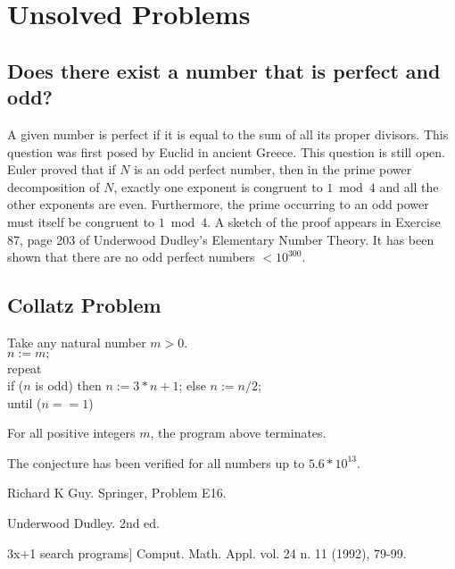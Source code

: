\section{Unsolved Problems}

\subsection{Does there exist a number that is perfect and odd?}

A given number is perfect if it is equal to the sum of all its proper
divisors. This question was first posed by Euclid in ancient Greece.
This question is still open.  Euler proved that if $N$ is an odd perfect
number, then in the prime power decomposition of $N$, exactly one
exponent is congruent to $1 \bmod 4$ and all the other exponents are
even. Furthermore, the prime occurring to an odd power must itself be
congruent to $1 \bmod 4$.  A sketch of the proof appears in Exercise 87,
page 203 of Underwood Dudley's Elementary Number Theory.  It has been
shown that there are no odd perfect numbers $< 10^{300}$.

\subsection{Collatz Problem}


Take any natural number $m > 0$.\\
$n:=m;$\\
repeat\\
\hspace{1cm}  if ($n$ is odd) then $n:=3*n+1$; else $n:=n/2$;\\
until ($n==1$)\\

\begin{conj}
  For all positive integers $m$, the program above terminates.
\end{conj}

The conjecture has been verified for all numbers up to $5.6 * 10^{13}$.

\Ref

  {Richard K Guy.}  {Springer,
  Problem E16.}

  {Underwood Dudley.}  {2nd ed.}

 {3x+1 search programs}]
{Comput. Math. Appl.}  {vol. 24 n. 11 (1992), 79-99.}

%
 
